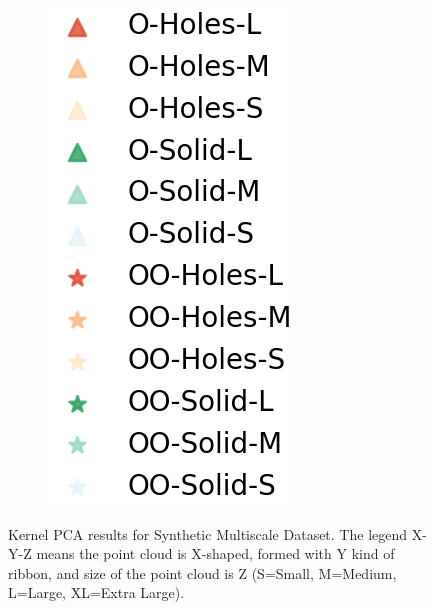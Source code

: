 \documentclass[10pt]{article}
\begin{document}
\begin{figure}[H]
\begin{subfigure}[h]{0.08\textwidth}
        \includegraphics[width=\linewidth]{ms_legend}
    \end{subfigure}%
    \caption{Kernel PCA results for Synthetic Multiscale Dataset. The legend X-Y-Z means the point cloud is X-shaped, formed with Y kind of ribbon, and size of the point cloud is Z (S=Small, M=Medium, L=Large, XL=Extra Large).}
\end{figure}
\end{document}
